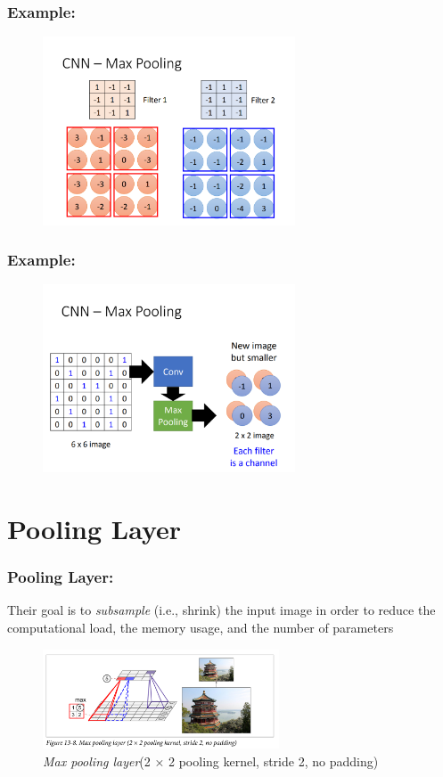 \documentclass{beamer}
\begin{document}
    \begin{frame}
    \frametitle{Example: }
        \begin{figure}[H]
            \begin{center}
                \includegraphics[width=7.5cm]{ppt8}
            \end{center}
        \end{figure}
    \end{frame}
    \begin{frame}
    \frametitle{Example: }
        \begin{figure}[H]
            \begin{center}
                \includegraphics[width=7.5cm]{ppt9}
            \end{center}
        \end{figure}
    \end{frame} 
\section{Pooling Layer}
    \begin{frame}
    \frametitle{Pooling Layer: }
        Their  goal  is  to  \emph{subsample}  (i.e.,  shrink)  the  input  image  in  order  to
        reduce  the  computational  load,  the  memory  usage,  and  the  number  of  parameters
    \begin{figure}[H]
            \begin{center}
                \includegraphics[width=7cm]{FIGURE13-8}
            \end{center}
        \caption{\emph{Max pooling layer}(2 × 2 pooling kernel, stride 2, no padding)}
        \end{figure}
    \end{frame}
\end{document}
